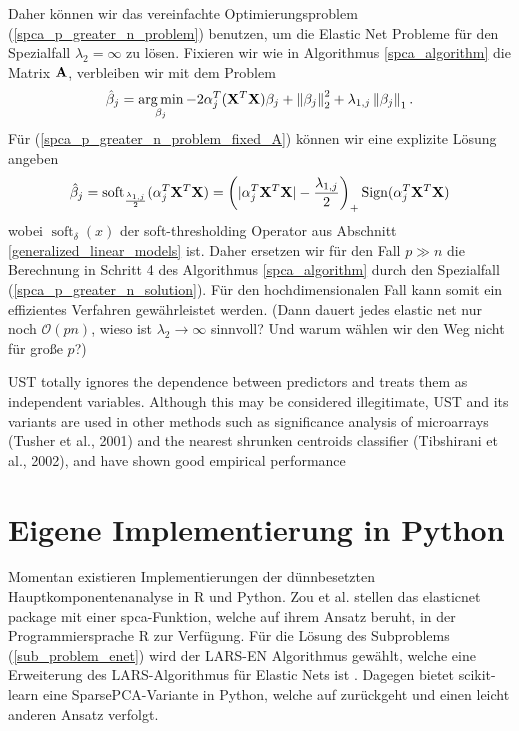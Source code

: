 Daher können wir das vereinfachte Optimierungsproblem (\ref{spca_p_greater_n_problem}) benutzen, um die Elastic Net Probleme für den Spezialfall $\lambda_2 = \infty$ zu lösen. Fixieren wir wie in Algorithmus \ref{spca_algorithm} die Matrix $\mathbf{A}$, verbleiben wir mit dem Problem
\begin{align}
\label{spca_p_greater_n_problem_fixed_A}
\hat{\beta}_j = \operatorname*{arg\,min}_{\beta_j} -2 \alpha_j^T(\mathbf{X}^T\mathbf{X})\beta_j + \left\lVert \beta_j \right\rVert_{2}^{2} + \lambda_{1,j}\left\lVert \beta_j \right\rVert_1.
\end{align}
Für (\ref{spca_p_greater_n_problem_fixed_A}) können wir eine explizite Lösung angeben
\begin{align}
\label{spca_p_greater_n_solution}
\hat{\beta}_j = \operatorname{soft}_{\frac{\lambda_{1,j}}{2}}(\alpha_j^T\mathbf{X}^T\mathbf{X}) = \left(|\alpha_j^T\mathbf{X}^T\mathbf{X}| - \frac{\lambda_{1,j}}{2}\right)_+ \operatorname{Sign}(\alpha_j^T\mathbf{X}^T\mathbf{X})
\end{align}
wobei $\operatorname{soft}_{\delta}(x)$ der soft-thresholding Operator aus Abschnitt \ref{generalized_linear_models} ist. Daher ersetzen wir für den Fall $p \gg n$ die Berechnung in Schritt 4 des Algorithmus \ref{spca_algorithm} durch den Spezialfall (\ref{spca_p_greater_n_solution}). Für den hochdimensionalen Fall kann somit ein effizientes Verfahren gewährleistet werden. (Dann dauert jedes elastic net nur noch $\mathcal{O}(pn)$, wieso ist $\lambda_2 \to \infty$ sinnvoll? Und warum wählen wir den Weg nicht für große $p$?)

UST totally ignores the dependence between predictors and treats them as independent variables. Although this may be considered illegitimate, UST and its variants are used in other methods such as significance analysis of microarrays (Tusher et al., 2001) and the nearest shrunken
centroids classifier (Tibshirani et al., 2002), and have shown good empirical performance




\section{Eigene Implementierung in Python}

Momentan existieren Implementierungen der dünnbesetzten Hauptkomponentenanalyse in R und Python. Zou et al. stellen das elasticnet package mit einer spca-Funktion, welche auf ihrem Ansatz beruht, in der Programmiersprache R zur Verfügung. Für die Lösung des Subproblems (\ref{sub_problem_enet}) wird der LARS-EN Algorithmus gewählt, welche eine Erweiterung des LARS-Algorithmus für Elastic Nets ist \cite{zou_elasticnet}. Dagegen bietet scikit-learn eine SparsePCA-Variante in Python, welche auf \cite{jenatton} zurückgeht und einen leicht anderen Ansatz verfolgt.

